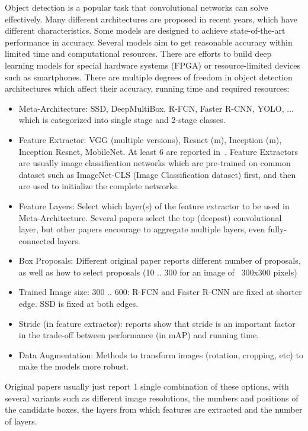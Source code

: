 \documentclass[conference]{IEEEtran}
\begin{document}
Object detection is a popular task that convolutional networks can solve effectively. Many different architectures are proposed in recent years, which have different characteristics. Some models are designed to achieve state-of-the-art performance in accuracy. Several models aim to get reasonable accuracy within limited time and computational resources. There are efforts to build deep learning models for special hardware systems (FPGA) or resource-limited devices such as smartphones. There are multiple degrees of freedom in object detection architectures which affect their accuracy, running time and required resources:

\begin{itemize}
    \item Meta-Architecture: SSD, DeepMultiBox, R-FCN, Faster R-CNN, YOLO, ... which is categorized into single stage and 2-stage classes.
    \item Feature Extractor: VGG (multiple versions), Resnet (m), Inception (m), Inception Resnet, MobileNet. At least 6 are reported in~\cite{huang2017speed}. Feature Extractors are usually image classification networks which are pre-trained on common dataset such as ImageNet-CLS (Image Classification dataset) first, and then are used to initialize the complete networks. 
    \item Feature Layers: Select which layer(s) of the feature extractor to be used in Meta-Architecture. Several papers select the top (deepest) convolutional layer, but other papers encourage to aggregate multiple layers, even fully-connected layers.
    \item Box Proposals: Different original paper reports different number of proposals, as well as how to select proposals (10 .. 300 for an image of ~300x300 pixels)
    \item Trained Image size: 300 .. 600: R-FCN and Faster R-CNN are fixed at shorter edge. SSD is fixed at both edges.
    \item Stride (in feature extractor): reports show that stride is an important factor in the trade-off between performance (in mAP) and running time.
    \item Data Augmentation: Methods to transform images (rotation, cropping, etc) to make the models more robust.
\end{itemize}

Original papers usually just report 1 single combination of these options, with several variants such as different image resolutions, the numbers and positions of the candidate boxes, the layers from which features are extracted and the number of layers.
\end{document}

